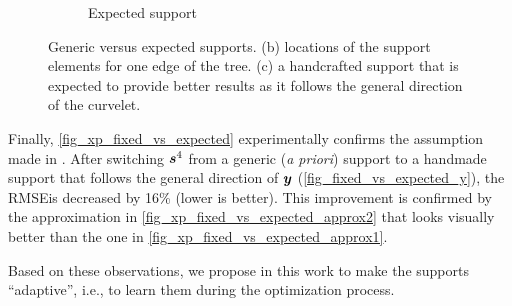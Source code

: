 \begin{figure}[!ht]
\begin{subfigure}[b]{0.32\textwidth}
	\caption{Expected support}
\end{subfigure}
\caption{Generic versus expected supports. (b) locations of the support elements for one edge of the tree. (c) a handcrafted support that is expected to provide better results as it follows the general direction of the curvelet.}\label{fig_fixed_vs_expected}
\end{figure}
\FloatBarrier

\noindent
Finally, \cref{fig_xp_fixed_vs_expected} experimentally confirms the assumption made in . After switching $\bm{s}^4$ from a generic (\textit{a priori}) support to a handmade support that follows the general direction of $\bm{y}$ (\cref{fig_fixed_vs_expected_y}), the RMSE\footnotemark[1] is decreased by 16\% (lower is better). This improvement is confirmed by the approximation in \cref{fig_xp_fixed_vs_expected_approx2} that looks visually better than the one in \cref{fig_xp_fixed_vs_expected_approx1}.

\noindent
Based on these observations, we propose in this work to make the supports “adaptive”, i.e., to learn them during the optimization process.



